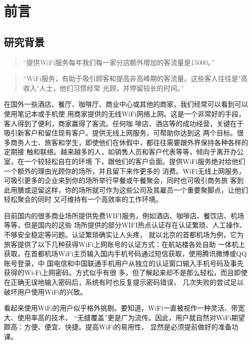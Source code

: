 \chapter{前言}

\section{研究背景}

\begin{quote}
  ``提供WiFi服务每年我们每一家分店额外增加的客流量是15000。''
\end{quote}


\begin{quote}
  ``WiFi服务，有助于吸引顾客和提高非高峰期的客流量。这些客人往往是"高收入"人士，他们习惯经常
  光顾，并停留较长的时间。''
\end{quote}

在国外一些酒店、餐厅、咖啡厅、商业中心或其他的商家，我们经常可以看到可以使用笔记本或手机使
用商家提供的无线WiFi网络上网。这是一个非常好的手段，客人得到了便利，商家赢得了客流。任何咖
啡店、酒店等的成功经营，关键在于吸引新客户和留住现有客户。提供无线上网服务，可帮助你达到这
两个目标。很多商务人士、旅客和学生，即使他们在休假中，都往往需要跟外界保持各种各样的定期接
触和联络。越来越多的人，如销售人员和客户代表等等，倾向于离开办公室，在一个较轻松自在的环境
下，跟他们的客户会面。提供WiFi服务绝对给他们一个额外的理由光顾你的场所，并且留下来作更多的
消费。WiFi无线上网服务，可吸引更多的企业来到你的场所举行早餐或午餐聚会，同时也可吸引商务旅
客到此用膳或逗留这样，你的场所就可作为这些公司及其雇员一个重要聚脚点，让他们轻松聚会的同时
又可维持有一个高效率的工作环境。

目前国内的很多商业场所提供免费WIFI服务，例如酒店、咖啡店、餐饮店、机场等等，但是国内的这些
场所提供的部分WIFI热点认证存在认证繁琐、人工操作、不够安全稳定等问题。认证繁琐确实让人头疼，
就以北京的首都机场为例，它为旅客提供了以下几种获得WiFi上网账号的认证方式：在航站楼各处自助
一体机上获取，在首都机场WiFi主页输入国内手机号码通过短信获取，使用腾讯微博或QQ账号登录，中
国电信和中国联通手机用户从独立的认证窗口输入手机号码及事先获得的Wi-Fi上网密码。方式似乎有很
多，但了解起来却不是那么轻松，而且即使在正确无误地输入密码后，系统有时也反复提示密码错误，
几次失败的尝试足以破坏用户使用WiFi的兴致。

看起来使用WiFi的用户似乎格外挑剔。要知道，WiFi一直被视作一种灵活、带宽大、使用率高的技术，
“无缝覆盖”更是广为流传。因此，用户就自然对WiFi期望颇高：方便、便宜、快捷。提高WiFi的易用性，
显然是必须提前做好的准备功课。

